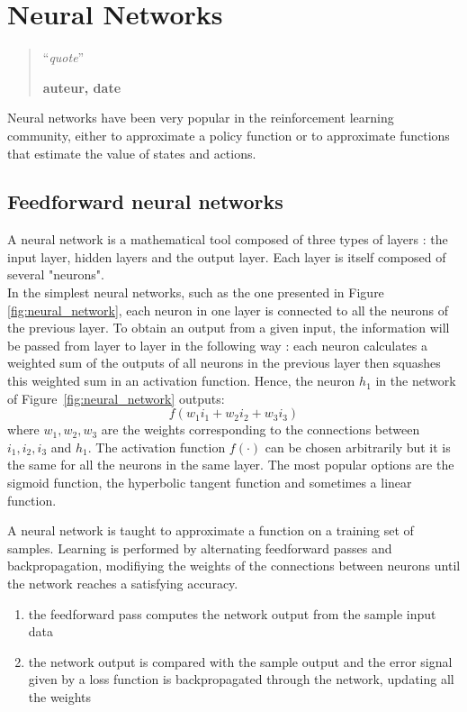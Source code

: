 \chapter{Neural Networks}
\begin{quotation}
\noindent ``\emph{quote}''
\begin{flushright}\textbf{auteur, date}\end{flushright}
\end{quotation}

\vspace*{0.5cm}


Neural networks have been very popular in the reinforcement learning community,
either to approximate a policy function or to approximate functions that
estimate the value of states and actions.\\

\section{Feedforward neural networks}
A neural network is a mathematical tool composed of three types of layers : 
the input layer, hidden layers and the output layer. Each layer is itself
composed of several "neurons".\\

In the simplest neural networks, such as the one presented in Figure~
\ref{fig:neural_network}, each neuron in one layer is connected to all the
neurons of the previous layer. To obtain an output from a given input,
the information will be passed from layer to layer in the following way : 
each neuron calculates a weighted sum of the outputs of all neurons in the
previous layer then squashes this weighted sum in an activation function. 
Hence, the neuron $h_1$ in the network of Figure~\ref{fig:neural_network}
outputs:
$$ f(w_1i_1 + w_2i_2 + w_3i_3) $$
where $w_1, w_2, w_3$ are the weights corresponding to the connections between
$i_1, i_2, i_3$ and $h_1$. The activation function $f(\cdot)$ can be chosen 
arbitrarily but it is
the same for all the neurons in the same layer. The most popular options are
the sigmoid function, the hyperbolic tangent function and sometimes a linear
function.

A neural network is taught to approximate a function on a training
set of samples. Learning is performed by alternating feedforward passes and 
backpropagation, modifiying the weights of the connections between neurons until
the network reaches a satisfying accuracy.

\begin{enumerate}
	\item the feedforward pass computes the network output from the sample
		input data
	\item the network output is compared with the sample output and the
		error signal given by a loss function
		is backpropagated through the network, updating
		all the weights
\end{enumerate}

